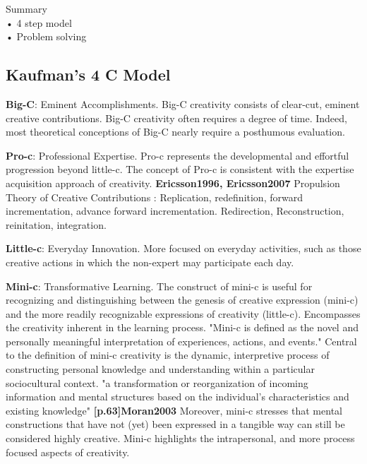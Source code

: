 \begin{shaded}
  Summary\\
  •	4 step model\\
  •	Problem solving
\end{shaded}

\subsection{Kaufman's 4 C Model}

\citep{Kaufman2009}

\textbf{Big-C}: Eminent Accomplishments. Big-C creativity consists of clear-cut, eminent creative contributions. Big-C creativity often requires a degree of time. Indeed, most theoretical conceptions of Big-C nearly require a posthumous evaluation.

\textbf{Pro-c}: Professional Expertise. Pro-c represents the developmental and effortful progression beyond little-c. The concept of Pro-c is consistent with the expertise acquisition approach of creativity. \textbf{Ericsson1996, Ericsson2007} Propulsion Theory of Creative Contributions \citep{Sternberg1999,Sternberg2006}: Replication, redefinition, forward incrementation, advance forward incrementation. Redirection, Reconstruction, reinitation, integration.

\textbf{Little-c}: Everyday Innovation. More focused on everyday activities, such as those creative actions in which the non-expert may participate each day.

\textbf{Mini-c}: Transformative Learning. The construct of mini-c is useful for recognizing and distinguishing between the genesis of creative expression (mini-c) and the more readily recognizable expressions of creativity (little-c). Encompasses the creativity inherent in the learning process. "Mini-c is defined as the novel and personally meaningful interpretation of experiences, actions, and events." \citep{Beghetto2007} Central to the definition of mini-c creativity is the dynamic, interpretive process of constructing personal knowledge and understanding within a particular sociocultural context. "a transformation or reorganization of incoming information and mental structures based on the individual's characteristics and existing knowledge" \textbf{[p.63]Moran2003} Moreover, mini-c stresses that mental constructions that have not (yet) been expressed in a tangible way can still be considered highly creative. Mini-c highlights the intrapersonal, and more process focused aspects of creativity.

